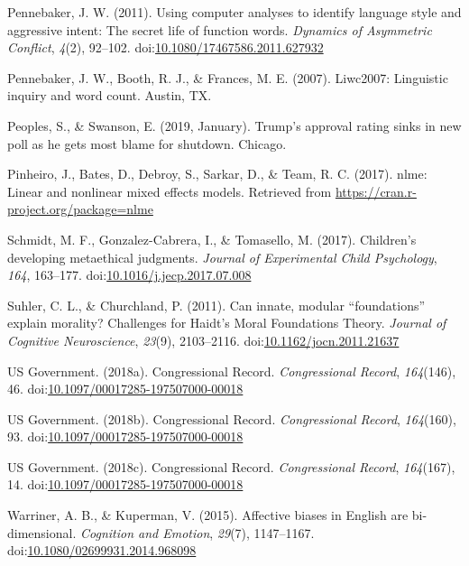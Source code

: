 \documentclass[english,,man]{apa6}
\begin{document}
\hypertarget{ref-Pennebaker2011}{}
Pennebaker, J. W. (2011). Using computer analyses to identify language
style and aggressive intent: The secret life of function words.
\emph{Dynamics of Asymmetric Conflict}, \emph{4}(2), 92--102.
doi:\href{https://doi.org/10.1080/17467586.2011.627932}{10.1080/17467586.2011.627932}

\hypertarget{ref-Pennebaker2007}{}
Pennebaker, J. W., Booth, R. J., \& Frances, M. E. (2007). Liwc2007:
Linguistic inquiry and word count. Austin, TX.

\hypertarget{ref-Peoples2019}{}
Peoples, S., \& Swanson, E. (2019, January). Trump's approval rating
sinks in new poll as he gets most blame for shutdown. Chicago.

\hypertarget{ref-Pinheiro2017}{}
Pinheiro, J., Bates, D., Debroy, S., Sarkar, D., \& Team, R. C. (2017).
nlme: Linear and nonlinear mixed effects models. Retrieved from
\url{https://cran.r-project.org/package=nlme}

\hypertarget{ref-Schmidt2017}{}
Schmidt, M. F., Gonzalez-Cabrera, I., \& Tomasello, M. (2017).
Children's developing metaethical judgments. \emph{Journal of
Experimental Child Psychology}, \emph{164}, 163--177.
doi:\href{https://doi.org/10.1016/j.jecp.2017.07.008}{10.1016/j.jecp.2017.07.008}

\hypertarget{ref-Suhler2011}{}
Suhler, C. L., \& Churchland, P. (2011). Can innate, modular
``foundations'' explain morality? Challenges for Haidt's Moral
Foundations Theory. \emph{Journal of Cognitive Neuroscience},
\emph{23}(9), 2103--2116.
doi:\href{https://doi.org/10.1162/jocn.2011.21637}{10.1162/jocn.2011.21637}

\hypertarget{ref-USGovernment2018b}{}
US Government. (2018a). Congressional Record. \emph{Congressional
Record}, \emph{164}(146), 46.
doi:\href{https://doi.org/10.1097/00017285-197507000-00018}{10.1097/00017285-197507000-00018}

\hypertarget{ref-USGovernment2018}{}
US Government. (2018b). Congressional Record. \emph{Congressional
Record}, \emph{164}(160), 93.
doi:\href{https://doi.org/10.1097/00017285-197507000-00018}{10.1097/00017285-197507000-00018}

\hypertarget{ref-USGovernment2018a}{}
US Government. (2018c). Congressional Record. \emph{Congressional
Record}, \emph{164}(167), 14.
doi:\href{https://doi.org/10.1097/00017285-197507000-00018}{10.1097/00017285-197507000-00018}

\hypertarget{ref-Warriner2015}{}
Warriner, A. B., \& Kuperman, V. (2015). Affective biases in English are
bi-dimensional. \emph{Cognition and Emotion}, \emph{29}(7), 1147--1167.
doi:\href{https://doi.org/10.1080/02699931.2014.968098}{10.1080/02699931.2014.968098}
\end{document}
